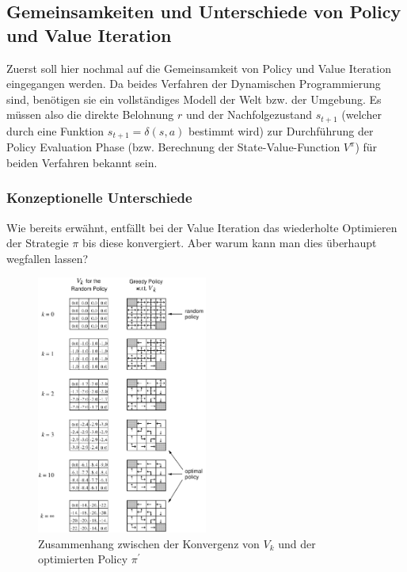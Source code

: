\documentclass[10pt]{scrartcl}
\begin{document}
\subsection{Gemeinsamkeiten und Unterschiede von Policy und Value Iteration}
\label{sec:dynamic_programming_unterschiede}
Zuerst soll hier nochmal auf die Gemeinsamkeit von Policy und Value Iteration eingegangen werden. 
Da beides Verfahren der Dynamischen Programmierung sind, benötigen sie ein vollständiges Modell der Welt bzw. der Umgebung.
Es müssen also die direkte Belohnung $r$ und der Nachfolgezustand $s_{t+1}$ (welcher durch eine Funktion $s_{t+1} = \delta(s,a)$ bestimmt wird) zur Durchführung der Policy Evaluation Phase (bzw. Berechnung der State-Value-Function $V^{\pi}$) für beiden Verfahren bekannt sein.

\subsubsection{Konzeptionelle Unterschiede}
Wie bereits erwähnt, entfällt bei der Value Iteration das wiederholte Optimieren der Strategie $\pi$ bis diese konvergiert.
Aber warum kann man dies überhaupt wegfallen lassen?\\

\begin{figure}[htbp]
	\centering	\includegraphics[width=0.5\textwidth]{Bilder/KonvergenzVkPolicy}
	\caption{Zusammenhang zwischen der Konvergenz von $V_{k}$ und der optimierten Policy $\pi^{'}$ }
	\label{fig:konvergenz}
\end{figure}
\end{document}
